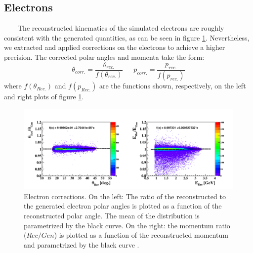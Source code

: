 \subsection{Electrons}
~~~~The reconstructed kinematics of the simulated electrons are roughly consistent with the generated quantities, as can be seen in figure \ref{fig:electron_corrections}. Nevertheless, we extracted and applied corrections on the electrons to achieve a higher precision. The corrected polar angles and momenta take the form:
\begin{equation}
\theta_{corr.} = \frac{\theta_{rec.}}{f(\theta_{rec.})} ~~~~~~~ p_{corr.} = \frac{p_{rec.}}{f(p_{rec.})}
\label{equation:correcting_function}
\end{equation}  
where $f(\theta_{Rec.})$ and $f(p_{Rec.})$ are the functions shown, respectively, on the left and right plots of figure \ref{fig:electron_corrections}.
\begin{figure}[tbp]
\centering
\includegraphics[scale=0.41]{fig_simulation/before_electron_Rec_gen.png}
\caption{Electron corrections. On the left: The ratio of the reconstructed to the generated electron polar angles is plotted as a function of the reconstructed polar angle. The mean of the distribution is parametrized by the black curve. On the right: the momentum ratio ($Rec/Gen$) is plotted as a function of the reconstructed momentum and parametrized by the black curve .} 
\label{fig:electron_corrections}
\end{figure}

